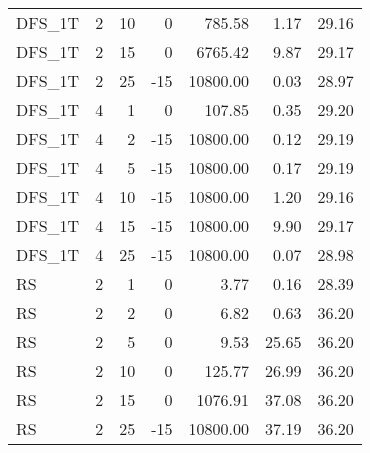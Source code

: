 \begin{center}
\begin{longtable}{lrrrrrr}
  DFS\_1T     & 2 & 10 &   0 & 785.58 & 1.17 & 29.16 \\ 
  DFS\_1T     & 2 & 15 &   0 & 6765.42 & 9.87 & 29.17 \\ 
  DFS\_1T     & 2 & 25 & -15 & 10800.00 & 0.03 & 28.97 \\ 
  DFS\_1T     & 4 & 1 &   0 & 107.85 & 0.35 & 29.20 \\ 
  DFS\_1T     & 4 & 2 & -15 & 10800.00 & 0.12 & 29.19 \\ 
  DFS\_1T     & 4 & 5 & -15 & 10800.00 & 0.17 & 29.19 \\ 
  DFS\_1T     & 4 & 10 & -15 & 10800.00 & 1.20 & 29.16 \\ 
  DFS\_1T     & 4 & 15 & -15 & 10800.00 & 9.90 & 29.17 \\ 
  DFS\_1T     & 4 & 25 & -15 & 10800.00 & 0.07 & 28.98 \\ 
  RS     & 2 & 1 &   0 & 3.77 & 0.16 & 28.39 \\ 
  RS     & 2 & 2 &   0 & 6.82 & 0.63 & 36.20 \\ 
  RS     & 2 & 5 &   0 & 9.53 & 25.65 & 36.20 \\ 
  RS     & 2 & 10 &   0 & 125.77 & 26.99 & 36.20 \\ 
  RS     & 2 & 15 &   0 & 1076.91 & 37.08 & 36.20 \\ 
  RS     & 2 & 25 & -15 & 10800.00 & 37.19 & 36.20 \\ 

\end{longtable}
\end{center}

